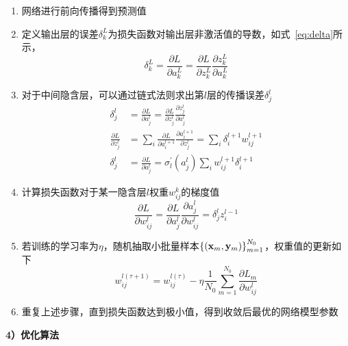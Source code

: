 \begin{enumerate}[label=(\alph*)]
  \item 网络进行前向传播得到预测值
  \item 定义输出层的误差$\delta_k^L$为损失函数对输出层非激活值的导数，如式~\ref{eq:delta}所示，
  \begin{equation}
    \delta_k^L = \frac{\partial L}{\partial a_k^L} = \frac{\partial L}{\partial z_k^L} \frac{\partial z_k^L}{\partial a_k^L}
    \label{eq:delta}
  \end{equation}
  \item 对于中间隐含层，可以通过链式法则求出第$l$层的传播误差$\delta_j^l$
  \begin{equation}
    \begin{aligned}
    \delta_j^l & = \frac{\partial L}{\partial a_j^l} = \frac{\partial L}{\partial z_j^l} \frac{\partial z_j^l}{\partial a_j^l} \\
    \frac{{\partial L}}{{\partial z_j^l}} & = \sum\limits_i^{} {\frac{{\partial L}}{{\partial a_i^{l + 1}}}} \frac{{\partial a_i^{l + 1}}}{{\partial z_j^l}} = \sum\limits_i^{} {\delta _i^{l + 1}} w_{ij}^{l + 1} \\
    \delta_j^l & = \frac{{\partial L}}{{\partial a_j^l}} = \sigma _l^\prime \left( {a_j^l} \right)\sum\limits_i^{} {w_{ij}^{l + 1}} \delta _i^{l + 1}
    \end{aligned}
    \label{eq:delta_l}
  \end{equation}
  \item 计算损失函数对于某一隐含层$l$权重$w_{ij}^k$的梯度值
  \begin{equation}
    \frac{{\partial L}}{{\partial w_{ij}^l}} = \frac{{\partial L}}{{\partial a_j^l}}\frac{{\partial a_j^l}}{{\partial w_{ij}^l}} = \delta_j^l z_i^{l - 1}
    \label{eq:delta_w}
  \end{equation}
  \item 若训练的学习率为$\eta$，随机抽取小批量样本$\left\{ {\left( {{{\bf{x}}_m},{{\bf{y}}_m}} \right)} \right\}_{m = 1}^{{N_0}}$，权重值的更新如下
  \begin{equation}
    w_{ij}^{l(\tau  + 1)} = w_{ij}^{l(\tau )} - \eta \frac{1}{{{N_0}}}\sum\limits_{m = 1}^{{N_0}} {\frac{{\partial {L_m}}}{{\partial w_{ij}^l}}}
    \label{eq:update}
  \end{equation}
  \item 重复上述步骤，直到损失函数达到极小值，得到收敛后最优的网络模型参数
\end{enumerate}

\textbf{4）优化算法}

